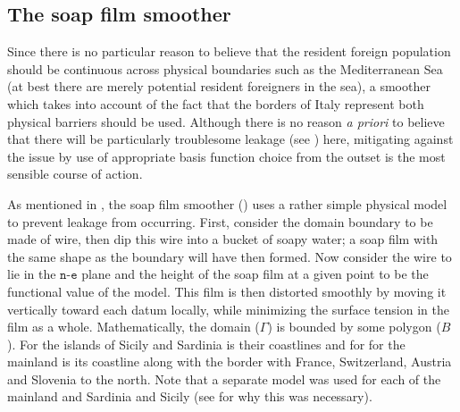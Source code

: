 \subsection{The soap film smoother \label{SF}}

Since there is no particular reason to believe that the resident foreign population should be continuous across physical boundaries such as the Mediterranean Sea (at best there are merely potential resident foreigners in the sea), a smoother which takes into account of the fact that the borders of Italy represent both physical barriers should be used. Although there is no reason \textit{a priori} to believe that there will be particularly troublesome leakage (see ) here, mitigating against the issue by use of appropriate basis function choice from the outset is the most sensible course of action. 

As mentioned in , the soap film smoother (\cite{soap}) uses a rather simple physical model to prevent leakage from occurring. First, consider the domain boundary to be made of wire, then dip this wire into a bucket of soapy water; a soap film with the same shape as the boundary will have then formed. Now consider the wire to lie in the $\texttt{n}$-$\texttt{e}$ plane and the height of the soap film at a given point to be the functional value of the model. This film is then distorted smoothly by moving it vertically toward each datum locally, while minimizing the surface tension in the film as a whole. Mathematically, the domain ($\Gamma$) is bounded by some polygon ($B$). For the islands of Sicily and Sardinia is their coastlines and for for the mainland is its coastline along with the border with France, Switzerland, Austria and Slovenia to the north. Note that a separate model was used for each of the mainland and Sardinia and Sicily (see  for why this was necessary).


